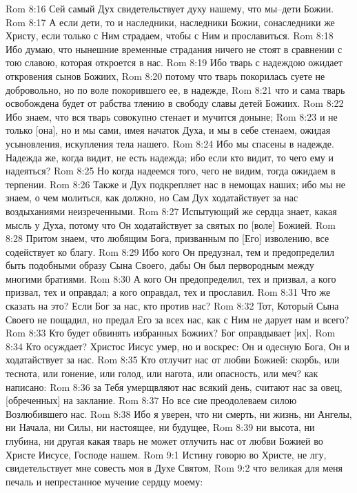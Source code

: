 Rom 8:16  Сей самый Дух свидетельствует духу нашему, что мы--дети Божии.
Rom 8:17  А если дети, то и наследники, наследники Божии, сонаследники же Христу, если только с Ним страдаем, чтобы с Ним и прославиться.
Rom 8:18  Ибо думаю, что нынешние временные страдания ничего не стоят в сравнении с тою славою, которая откроется в нас.
Rom 8:19  Ибо тварь с надеждою ожидает откровения сынов Божиих,
Rom 8:20  потому что тварь покорилась суете не добровольно, но по воле покорившего ее, в надежде,
Rom 8:21  что и сама тварь освобождена будет от рабства тлению в свободу славы детей Божиих.
Rom 8:22  Ибо знаем, что вся тварь совокупно стенает и мучится доныне;
Rom 8:23  и не только [она], но и мы сами, имея начаток Духа, и мы в себе стенаем, ожидая усыновления, искупления тела нашего.
Rom 8:24  Ибо мы спасены в надежде. Надежда же, когда видит, не есть надежда; ибо если кто видит, то чего ему и надеяться?
Rom 8:25  Но когда надеемся того, чего не видим, тогда ожидаем в терпении.
Rom 8:26  Также и Дух подкрепляет нас в немощах наших; ибо мы не знаем, о чем молиться, как должно, но Сам Дух ходатайствует за нас воздыханиями неизреченными.
Rom 8:27  Испытующий же сердца знает, какая мысль у Духа, потому что Он ходатайствует за святых по [воле] Божией.
Rom 8:28  Притом знаем, что любящим Бога, призванным по [Его] изволению, все содействует ко благу.
Rom 8:29  Ибо кого Он предузнал, тем и предопределил быть подобными образу Сына Своего, дабы Он был первородным между многими братиями.
Rom 8:30  А кого Он предопределил, тех и призвал, а кого призвал, тех и оправдал; а кого оправдал, тех и прославил.
Rom 8:31  Что же сказать на это? Если Бог за нас, кто против нас?
Rom 8:32  Тот, Который Сына Своего не пощадил, но предал Его за всех нас, как с Ним не дарует нам и всего?
Rom 8:33  Кто будет обвинять избранных Божиих? Бог оправдывает [их].
Rom 8:34  Кто осуждает? Христос Иисус умер, но и воскрес: Он и одесную Бога, Он и ходатайствует за нас.
Rom 8:35  Кто отлучит нас от любви Божией: скорбь, или теснота, или гонение, или голод, или нагота, или опасность, или меч? как написано:
Rom 8:36  за Тебя умерщвляют нас всякий день, считают нас за овец, [обреченных] на заклание.
Rom 8:37  Но все сие преодолеваем силою Возлюбившего нас.
Rom 8:38  Ибо я уверен, что ни смерть, ни жизнь, ни Ангелы, ни Начала, ни Силы, ни настоящее, ни будущее,
Rom 8:39  ни высота, ни глубина, ни другая какая тварь не может отлучить нас от любви Божией во Христе Иисусе, Господе нашем.
Rom 9:1  Истину говорю во Христе, не лгу, свидетельствует мне совесть моя в Духе Святом,
Rom 9:2  что великая для меня печаль и непрестанное мучение сердцу моему:
